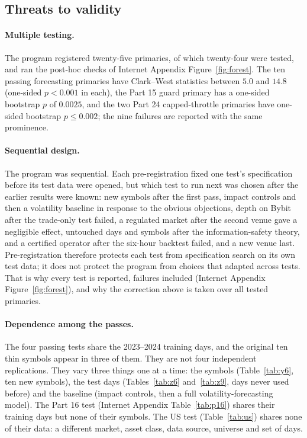 \documentclass[12pt]{article}
\theoremstyle{definition}
\theoremstyle{remark}
\begin{document}
\subsection{Threats to validity}\label{sec:threats}
\paragraph{Multiple testing.} The program registered twenty-five primaries, of which twenty-four were tested, and ran the post-hoc checks of Internet Appendix Figure~\ref{fig:forest}. The ten passing forecasting primaries have Clark--West statistics between $5.0$ and $14.8$ (one-sided $p<0.001$ in each), the Part 15 guard primary has a one-sided bootstrap $p$ of $0.0025$, and the two Part 24 capped-throttle primaries have one-sided bootstrap $p\le 0.002$; the nine failures are reported with the same prominence.

\paragraph{Sequential design.} The program was sequential. Each pre-registration fixed one test's specification before its test data were opened, but which test to run next was chosen after the earlier results were known: new symbols after the first pass, impact controls and then a volatility baseline in response to the obvious objections, depth on Bybit after the trade-only test failed, a regulated market after the second venue gave a negligible effect, untouched days and symbols after the information-safety theory, and a certified operator after the six-hour backtest failed, and a new venue last. Pre-registration therefore protects each test from specification search on its own test data; it does not protect the program from choices that adapted across tests. That is why every test is reported, failures included (Internet Appendix Figure~\ref{fig:forest}), and why the correction above is taken over all tested primaries.

\paragraph{Dependence among the passes.} The four passing tests share the 2023--2024 training days, and the original ten thin symbols appear in three of them. They are not four independent replications. They vary three things one at a time: the symbols (Table~\ref{tab:y6}, ten new symbols), the test days (Tables~\ref{tab:z6} and~\ref{tab:z9}, days never used before) and the baseline (impact controls, then a full volatility-forecasting model). The Part 16 test (Internet Appendix Table~\ref{tab:p16}) shares their training days but none of their symbols. The US test (Table~\ref{tab:us}) shares none of their data: a different market, asset class, data source, universe and set of days.
\end{document}
